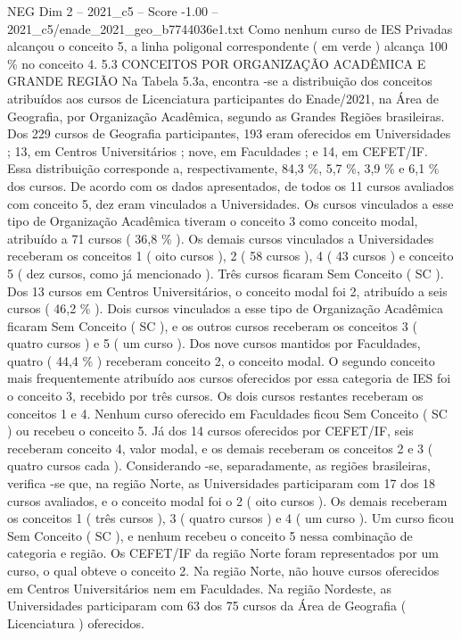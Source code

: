 \begin{textsample}{NEG Dim 2 – 2021\_c5 – Score -1.00 – 2021\_c5/enade\_2021\_geo\_b7744036e1.txt}
Como nenhum curso de IES Privadas alcançou o conceito 5, a linha poligonal correspondente ( em verde ) alcança 100 \% no conceito 4. 5.3 CONCEITOS POR ORGANIZAÇÃO ACADÊMICA E GRANDE REGIÃO Na Tabela 5.3a, encontra -se a distribuição dos conceitos atribuídos aos cursos de Licenciatura participantes do Enade/2021, na Área de Geografia, por Organização Acadêmica, segundo as Grandes Regiões brasileiras.
Dos 229 cursos de Geografia participantes, 193 eram oferecidos em Universidades ; 13, em Centros Universitários ; nove, em Faculdades ; e 14, em CEFET/IF.
Essa distribuição corresponde a, respectivamente, 84,3 \%, 5,7 \%, 3,9 \% e 6,1 \% dos cursos.
De acordo com os dados apresentados, de todos os 11 cursos avaliados com conceito 5, dez eram vinculados a Universidades.
Os cursos vinculados a esse tipo de Organização Acadêmica tiveram o conceito 3 como conceito modal, atribuído a 71 cursos ( 36,8 \% ).
Os demais cursos vinculados a Universidades receberam os conceitos 1 ( oito cursos ), 2 ( 58 cursos ), 4 ( 43 cursos ) e conceito 5 ( dez cursos, como já mencionado ).
Três cursos ficaram Sem Conceito ( SC ).
Dos 13 cursos em Centros Universitários, o conceito modal foi 2, atribuído a seis cursos ( 46,2 \% ).
Dois cursos vinculados a esse tipo de Organização Acadêmica ficaram Sem Conceito ( SC ), e os outros cursos receberam os conceitos 3 ( quatro cursos ) e 5 ( um curso ).
Dos nove cursos mantidos por Faculdades, quatro ( 44,4 \% ) receberam conceito 2, o conceito modal.
O segundo conceito mais frequentemente atribuído aos cursos oferecidos por essa categoria de IES foi o conceito 3, recebido por três cursos.
Os dois cursos restantes receberam os conceitos 1 e 4.
Nenhum curso oferecido em Faculdades ficou Sem Conceito ( SC ) ou recebeu o conceito 5.
Já dos 14 cursos oferecidos por CEFET/IF, seis receberam conceito 4, valor modal, e os demais receberam os conceitos 2 e 3 ( quatro cursos cada ).
Considerando -se, separadamente, as regiões brasileiras, verifica -se que, na região Norte, as Universidades participaram com 17 dos 18 cursos avaliados, e o conceito modal foi o 2 ( oito cursos ).
Os demais receberam os conceitos 1 ( três cursos ), 3 ( quatro cursos ) e 4 ( um curso ).
Um curso ficou Sem Conceito ( SC ), e nenhum recebeu o conceito 5 nessa combinação de categoria e região.
Os CEFET/IF da região Norte foram representados por um curso, o qual obteve o conceito 2.
Na região Norte, não houve cursos oferecidos em Centros Universitários nem em Faculdades.
Na região Nordeste, as Universidades participaram com 63 dos 75 cursos da Área de Geografia ( Licenciatura ) oferecidos.

\end{textsample}
